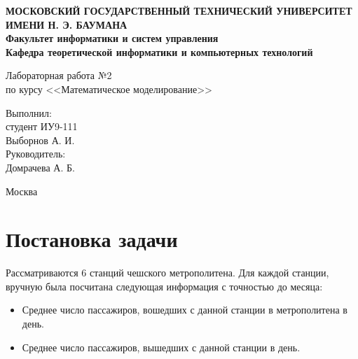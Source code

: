 \documentclass[12pt,a4paper,oneside]{extarticle}
\begin{document}
\pgfplotsset{compat=1.8}

\thispagestyle{empty}
\newpage
{
\centering


\textbf{
МОСКОВСКИЙ ГОСУДАРСТВЕННЫЙ ТЕХНИЧЕСКИЙ УНИВЕРСИТЕТ ИМЕНИ Н. Э. БАУМАНА \\
Факультет информатики и систем управления \\
Кафедра теоретической информатики и компьютерных технологий}
\bigskip
\bigskip
\bigskip
\bigskip
\bigskip
\bigskip
\bigskip

\vfill


Лабораторная работа №2 \\
по курсу <<Математическое моделирование>>

\bigskip

\bigskip

\vfill



\hfill\parbox{4cm} {
Выполнил:\\
студент ИУ9-111 \hfill \\
Выборнов А. И.\hfill \medskip\\
Руководитель:\\
Домрачева А. Б.\hfill
}


\vspace{\fill}

Москва \number\year
\clearpage
}



\clearpage


\section{Постановка задачи}
    Рассматриваются 6 станций чешского метрополитена. Для каждой станции, вручную была посчитана следующая информация с точностью до месяца:
    \begin{itemize}
        \item Среднее число пассажиров, вошедших с данной станции в метрополитена в день.
        \item Среднее число пассажиров, вышедших с данной станции в день.
    \end{itemize}
\end{document}
